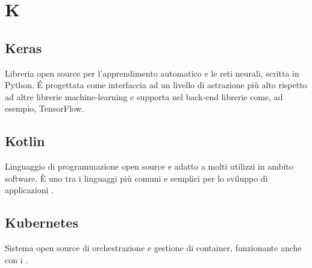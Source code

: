 \section*{K}
\markright{}
\subsection*{Keras}
Libreria open source per l'apprendimento automatico e le reti neurali, scritta in Python. \'E progettata come interfaccia ad un livello di astrazione più alto rispetto ad altre librerie machine-learning e supporta nel back-end librerie come, ad esempio, TensorFlow.

\subsection*{Kotlin}
Linguaggio di programmazione open source e adatto a molti utilizzi in ambito software. È uno tra i linguaggi più comuni e semplici per lo sviluppo di applicazioni .  

\subsection*{Kubernetes}
Sistema open source di orchestrazione e gestione di container, funzionante anche con i .